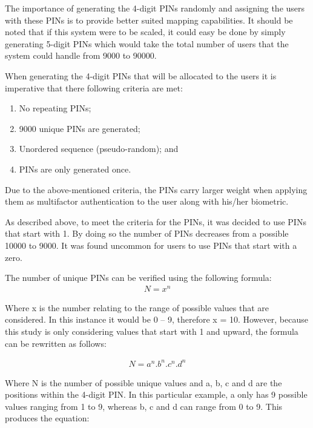 The importance of generating the 4-digit PINs randomly and assigning the users with these PINs is to provide better suited mapping capabilities. It should be noted that if this system were to be scaled, it could easy be done by simply generating 5-digit PINs which would take the total number of users that the system could handle from 9000 to 90000.

When generating the 4-digit PINs that will be allocated to the users it is imperative that there following criteria are met:

\begin{enumerate}[label=\roman*.]
    \item No repeating PINs;
    \item 9000 unique PINs are generated;
    \item Unordered sequence (pseudo-random); and
    \item PINs are only generated once.
\end{enumerate}





Due to the above-mentioned criteria, the PINs carry larger weight when applying them as multifactor authentication to the user along with his/her biometric. 

As described above, to meet the criteria for the PINs, it was decided to use PINs that start with 1. By doing so the number of PINs decreases from a possible 10000 to 9000. It was found uncommon for users to use PINs that start with a zero. 

The number of unique PINs can be verified using the following formula:
\begin{gather}
    N =  x^{n}    
\end{gather}


Where x is the number relating to the range of possible values that are considered. In this instance it would be 0 – 9, therefore x = 10. However, because this study is only considering values that start with 1 and upward, the formula can be rewritten as follows:

\begin{gather}
    N = a^{n}.b^{n}.c^{n}.d^{n}    
\end{gather}


Where N is the number of possible unique values and a, b, c and d are the positions within the 4-digit PIN. In this particular example, a only has 9 possible values ranging from 1 to 9, whereas b, c and d can range from 0 to 9. This produces the equation:


